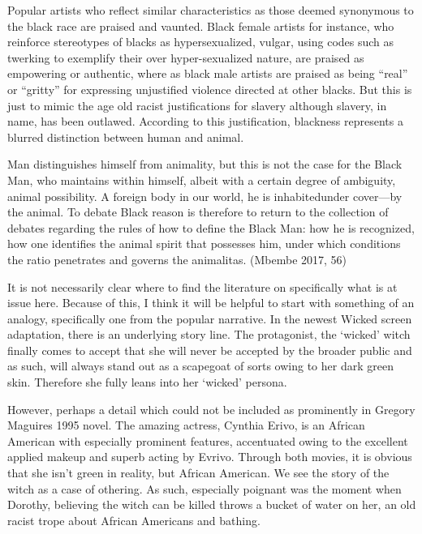 \documentclass[
  letterpaper,
  DIV=11,
  numbers=noendperiod]{scrreprt}
\begin{document}
\begin{tcolorbox}[enhanced jigsaw, arc=.35mm, breakable, rightrule=.15mm, colback=white, colframe=quarto-callout-important-color-frame, bottomrule=.15mm, leftrule=.75mm, opacityback=0, toprule=.15mm, left=2mm]
\begin{tcolorbox}[enhanced jigsaw, arc=.35mm, breakable, rightrule=.15mm, colback=white, colframe=quarto-callout-tip-color-frame, bottomrule=.15mm, leftrule=.75mm, opacityback=0, toprule=.15mm, left=2mm]
Popular artists who reflect similar characteristics as those deemed
synonymous to the black race are praised and vaunted. Black female
artists for instance, who reinforce stereotypes of blacks as
hypersexualized, vulgar, using codes such as twerking to exemplify their
over hyper-sexualized nature, are praised as empowering or authentic,
where as black male artists are praised as being ``real'' or ``gritty''
for expressing unjustified violence directed at other blacks. But this
is just to mimic the age old racist justifications for slavery although
slavery, in name, has been outlawed. According to this justification,
blackness represents a blurred distinction between human and animal.

Man distinguishes himself from animality, but this is not the case for
the Black Man, who maintains within himself, albeit with a certain
degree of ambiguity, animal possibility. A foreign body in our world, he
is inhabited­under cover---by the animal. To debate Black reason is
therefore to return to the collection of debates regarding the rules of
how to define the Black Man: how he is recognized, how one identifies
the animal spirit that possesses him, ­under which conditions the ratio
penetrates and governs the animalitas. (Mbembe 2017, 56)

It is not necessarily clear where to find the literature on specifically
what is at issue here. Because of this, I think it will be helpful to
start with something of an analogy, specifically one from the popular
narrative. In the newest Wicked screen adaptation, there is an
underlying story line. The protagonist, the `wicked' witch finally comes
to accept that she will never be accepted by the broader public and as
such, will always stand out as a scapegoat of sorts owing to her dark
green skin. Therefore she fully leans into her `wicked' persona.

However, perhaps a detail which could not be included as prominently in
Gregory Maguires 1995 novel. The amazing actress, Cynthia Erivo, is an
African American with especially prominent features, accentuated owing
to the excellent applied makeup and superb acting by Evrivo. Through
both movies, it is obvious that she isn't green in reality, but African
American. We see the story of the witch as a case of othering. As such,
especially poignant was the moment when Dorothy, believing the witch can
be killed throws a bucket of water on her, an old racist trope about
African Americans and bathing.


\end{tcolorbox}
\end{tcolorbox}
\end{document}
